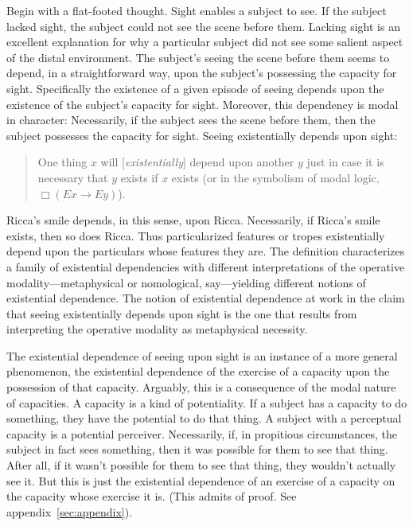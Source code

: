 \documentclass[12pt]{article}
\begin{document}
Begin with a flat-footed thought. Sight enables a subject to see. If the subject lacked sight, the subject could not see the scene before them. Lacking sight is an excellent explanation for why a particular subject did not see some salient aspect of the distal environment. The subject's seeing the scene before them seems to depend, in a straightforward way, upon the subject's possessing the capacity for sight. Specifically the existence of a given episode of seeing depends upon the existence of the subject's capacity for sight. Moreover, this dependency is modal in character: Necessarily, if the subject sees the scene before them, then the subject possesses the capacity for sight. Seeing existentially depends upon sight:
\begin{quote}
    One thing \( x \) will [\emph{existentially}] depend upon another \( y \) just in case it is necessary that \( y \) exists if \( x \) exists (or in the symbolism of modal logic, \( \Box(Ex \rightarrow Ey) \)). \citep[270]{Fine:1995ls} 
\end{quote}
Ricca's smile depends, in this sense, upon Ricca. Necessarily, if Ricca's smile exists, then so does Ricca. Thus particularized features or tropes existentially depend upon the particulars whose features they are. The definition characterizes a family of existential dependencies with different interpretations of the operative modality---metaphysical or nomological, say---yielding different notions of existential dependence. The notion of existential dependence at work in the claim that seeing existentially depends upon sight is the one that results from interpreting the operative modality as metaphysical necessity.

The existential dependence of seeing upon sight is an instance of a more general phenomenon, the existential dependence of the exercise of a capacity upon the possession of that capacity. Arguably, this is a consequence of the modal nature of capacities. A capacity is a kind of potentiality. If a subject has a capacity to do something, they have the potential to do that thing. A subject with a perceptual capacity is a potential perceiver. Necessarily, if, in propitious circumstances, the subject in fact sees something, then it was possible for them to see that thing. After all, if it wasn't possible for them to see that thing, they wouldn't actually see it. But this is just the existential dependence of an exercise of a capacity on the capacity whose exercise it is. (This admits of proof. See appendix~\ref{sec:appendix}).
\end{document}
